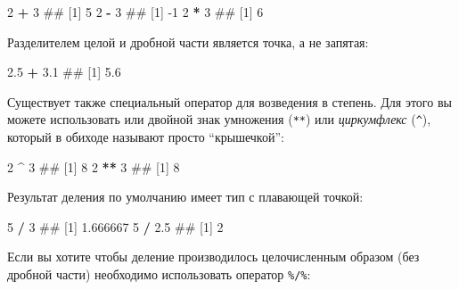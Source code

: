 \documentclass[]{book}
\newenvironment{Shaded}{\begin{snugshade}}{\end{snugshade}}
\newcommand{\DecValTok}[1]{\textcolor[rgb]{0.00,0.00,0.81}{#1}}
\newcommand{\FloatTok}[1]{\textcolor[rgb]{0.00,0.00,0.81}{#1}}
\newcommand{\StringTok}[1]{\textcolor[rgb]{0.31,0.60,0.02}{#1}}
\newcommand{\OperatorTok}[1]{\textcolor[rgb]{0.81,0.36,0.00}{\textbf{#1}}}
\newcommand{\NormalTok}[1]{#1}
\begin{document}
\begin{Shaded}
\begin{Highlighting}[]
\DecValTok{2} \OperatorTok{+}\StringTok{ }\DecValTok{3}
\NormalTok{## [1] 5}
\DecValTok{2} \OperatorTok{-}\StringTok{ }\DecValTok{3}
\NormalTok{## [1] -1}
\DecValTok{2} \OperatorTok{*}\StringTok{ }\DecValTok{3}
\NormalTok{## [1] 6}
\end{Highlighting}
\end{Shaded}

Разделителем целой и дробной части является точка, а не запятая:

\begin{Shaded}
\begin{Highlighting}[]
\FloatTok{2.5} \OperatorTok{+}\StringTok{ }\FloatTok{3.1}
\NormalTok{## [1] 5.6}
\end{Highlighting}
\end{Shaded}

Существует также специальный оператор для возведения в степень. Для
этого вы можете использовать или двойной знак умножения (\texttt{**})
или \emph{циркумфлекс} (\texttt{\^{}}), который в обиходе называют
просто ``крышечкой'':

\begin{Shaded}
\begin{Highlighting}[]
\DecValTok{2} \OperatorTok{^}\StringTok{ }\DecValTok{3}
\NormalTok{## [1] 8}
\DecValTok{2} \OperatorTok{**}\StringTok{ }\DecValTok{3}
\NormalTok{## [1] 8}
\end{Highlighting}
\end{Shaded}

Результат деления по умолчанию имеет тип с плавающей точкой:

\begin{Shaded}
\begin{Highlighting}[]
\DecValTok{5} \OperatorTok{/}\StringTok{ }\DecValTok{3}
\NormalTok{## [1] 1.666667}
\DecValTok{5} \OperatorTok{/}\StringTok{ }\FloatTok{2.5}
\NormalTok{## [1] 2}
\end{Highlighting}
\end{Shaded}

Если вы хотите чтобы деление производилось целочисленным образом (без
дробной части) необходимо использовать оператор \texttt{\%/\%}:

\begin{Shaded}
\end{Shaded}
\end{document}
